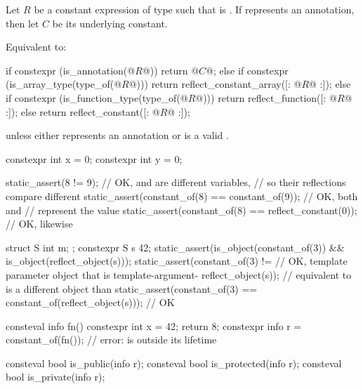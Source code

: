\begin{itemdescr}
\pnum
Let $R$ be a constant expression of type 
such that  is .
If  represents an annotation,
then let $C$ be its underlying constant.

\pnum
\effects
Equivalent to:
\begin{codeblock}
if constexpr (is_annotation(@$R$@)) {
  return @$C$@;
} else if constexpr (is_array_type(type_of(@$R$@))) {
  return reflect_constant_array([: @$R$@ :]);
} else if constexpr (is_function_type(type_of(@$R$@))) {
  return reflect_function([: @$R$@ :]);
} else {
  return reflect_constant([: @$R$@ :]);
}
\end{codeblock}

\pnum
\throws
{} unless
either  represents an annotation or
\tcode{[: $R$ :]} is a valid
.

\pnum
\begin{example}
\begin{codeblock}
constexpr int x = 0;
constexpr int y = 0;

static_assert(^^x != ^^y);                      // OK,  and  are different variables,
                                                // so their reflections compare different
static_assert(constant_of(^^x) ==
              constant_of(^^y));                // OK, both  and
                                                //  represent the value 
static_assert(constant_of(^^x) ==
              reflect_constant(0));             // OK, likewise

struct S { int m; };
constexpr S s {42};
static_assert(is_object(constant_of(^^s)) &&
              is_object(reflect_object(s)));
static_assert(constant_of(^^s) !=       // OK, template parameter object that is template-argument-
              reflect_object(s));       // equivalent to  is a different object than 
static_assert(constant_of(^^s) ==
              constant_of(reflect_object(s)));  // OK

consteval info fn() {
  constexpr int x = 42;
  return ^^x;
}
constexpr info r = constant_of(fn());           // error:  is outside its lifetime
\end{codeblock}
\end{example}
\end{itemdescr}

%
%
%
\begin{itemdecl}
consteval bool is_public(info r);
consteval bool is_protected(info r);
consteval bool is_private(info r);
\end{itemdecl}

